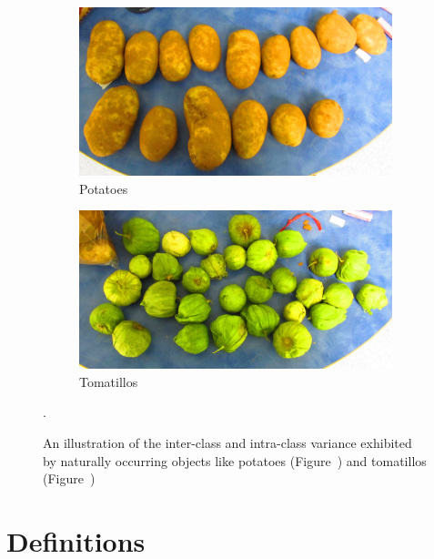 \documentclass {udthesis}
\begin{document}
\begin{figure}
  \centering
  \begin{subfigure}[]{0.45\textwidth}
      \includegraphics[width=\textwidth]{potatoes_species}
      \caption{Potatoes}
      \label{fig:potato_species}
  \end{subfigure}
  \begin{subfigure}[]{0.45\textwidth}
      \includegraphics[width=\textwidth]{tomatillos_species}
      \caption{Tomatillos}
      \label{fig:tomatillo_species}
  \end{subfigure}
\caption[Illustration of the inter-class and intra-class variance exhibited by naturally occurring objects]
{An illustration of the inter-class and intra-class variance exhibited by naturally occurring objects like 
potatoes (Figure~) and tomatillos (Figure~)}.
\label{fig:produce_species}
\end{figure}	
%
\section{Definitions}
\end{document}
